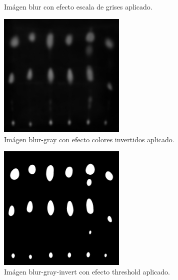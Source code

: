 \begin{itemize}
\begin{figure}[H]
	  \centering
	  \vspace{-0.4cm}
	  \caption{Im\'agen blur con efecto escala de grises aplicado.}
	  \label{fig:font-c-gray}
	  \vspace{-0.15cm}
	\end{figure}
	\begin{figure}[H]
	  \vspace{-0.2cm}
	  \centering
	  \includegraphics[width=230px]{imagenes-jtlc/experimento/search-samples/3-invert}
	  \centering
	  \vspace{-0.4cm}
	  \caption{Im\'agen blur-gray con efecto colores invertidos aplicado.}
	  \label{fig:font-c-invert}
	  \vspace{-0.15cm}
	\end{figure}
	\begin{figure}[H]
	  \vspace{-0.2cm}
	  \centering
	  \includegraphics[width=230px]{imagenes-jtlc/experimento/search-samples/4-threshold}
	  \centering
	  \vspace{-0.4cm}
	  \caption{Im\'agen blur-gray-invert con efecto threshold aplicado.}
	  \label{fig:font-c-thresh}
	  \vspace{-0.15cm}
	\end{figure}
	\begin{figure}[H]
	  \vspace{-0.2cm}
	  \centering

\end{figure}
\end{itemize}
